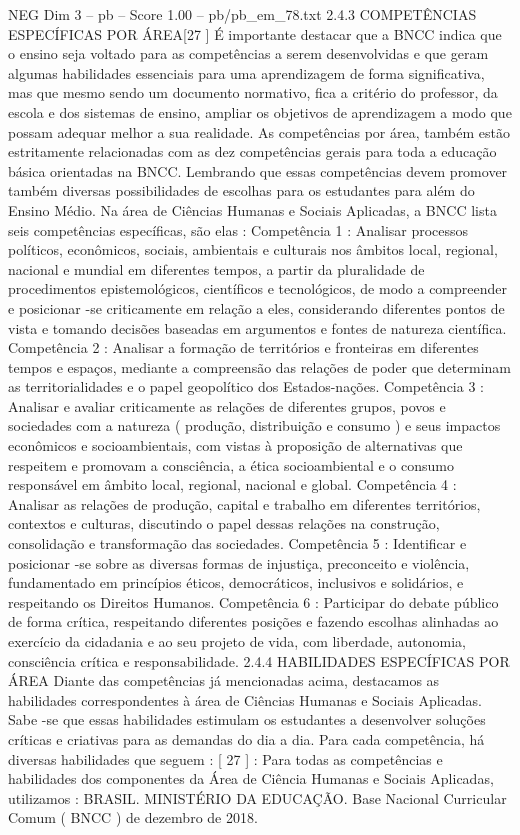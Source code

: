 \begin{textsample}{NEG Dim 3 – pb – Score 1.00 – pb/pb\_em\_78.txt}  \label{ex:f3_neg_206}
2.4.3 COMPETÊNCIAS ESPECÍFICAS POR ÁREA[27 ] É importante destacar que a BNCC indica que o ensino seja voltado para as competências a serem desenvolvidas e que geram algumas habilidades essenciais para uma aprendizagem de forma significativa, mas que mesmo sendo um documento normativo, fica a critério do professor, da escola e dos sistemas de ensino, ampliar os objetivos de aprendizagem a modo que possam adequar melhor a sua realidade.
As competências por área, também estão estritamente relacionadas com as dez competências gerais para toda a educação básica orientadas na BNCC.
Lembrando que essas competências devem promover também diversas possibilidades de escolhas para os estudantes para além do Ensino Médio.
Na área de Ciências Humanas e Sociais Aplicadas, a BNCC lista seis competências específicas, são elas : Competência 1 : Analisar processos políticos, econômicos, sociais, ambientais e culturais nos âmbitos local, regional, nacional e mundial em diferentes tempos, a partir da pluralidade de procedimentos epistemológicos, científicos e tecnológicos, de modo a compreender e posicionar -se criticamente em relação a eles, considerando diferentes pontos de vista e tomando decisões baseadas em argumentos e fontes de natureza científica.
Competência 2 : Analisar a formação de territórios e fronteiras em diferentes tempos e espaços, mediante a compreensão das relações de poder que determinam as territorialidades e o papel geopolítico dos Estados-nações.
Competência 3 : Analisar e avaliar criticamente as relações de diferentes grupos, povos e sociedades com a natureza ( produção, distribuição e consumo ) e seus impactos econômicos e socioambientais, com vistas à proposição de alternativas que respeitem e promovam a consciência, a ética socioambiental e o consumo responsável em âmbito local, regional, nacional e global.
Competência 4 : Analisar as relações de produção, capital e trabalho em diferentes territórios, contextos e culturas, discutindo o papel dessas relações na construção, consolidação e transformação das sociedades.
Competência 5 : Identificar e posicionar -se sobre as diversas formas de injustiça, preconceito e violência, fundamentado em princípios éticos, democráticos, inclusivos e solidários, e respeitando os Direitos Humanos.
Competência 6 : Participar do debate público de forma crítica, respeitando diferentes posições e fazendo escolhas alinhadas ao exercício da cidadania e ao seu projeto de vida, com liberdade, autonomia, consciência crítica e responsabilidade. 2.4.4 HABILIDADES ESPECÍFICAS POR ÁREA Diante das competências já mencionadas acima, destacamos as habilidades correspondentes à área de Ciências Humanas e Sociais Aplicadas.
Sabe -se que essas habilidades estimulam os estudantes a desenvolver soluções críticas e criativas para as demandas do dia a dia.
Para cada competência, há diversas habilidades que seguem : [ 27 ] : Para todas as competências e habilidades dos componentes da Área de Ciência Humanas e Sociais Aplicadas, utilizamos : BRASIL.
MINISTÉRIO DA EDUCAÇÃO.
Base Nacional Curricular Comum ( BNCC ) de dezembro de 2018.

\end{textsample}
